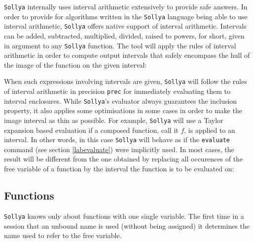 \documentclass[a4paper]{article}
\newcommand{\com}[1]{\texttt{#1}}
\newcommand{\sollya}{\texttt{Sollya}\xspace}
\begin{document}


\sollya internally uses interval arithmetic extensively to provide
safe answers. In order to provide for algorithms written in the
\sollya language being able to use interval arithmetic, \sollya offers
native support of interval arithmetic. Intervals can be added,
subtracted, multiplied, divided, raised to powers, for short, given in
argument to any \sollya function. The tool will apply the rules of
interval arithmetic in order to compute output intervals that safely
encompass the hull of the image of the function on the given interval:



When such expressions involving intervals are given, \sollya will
follow the rules of interval arithmetic in precision \com{prec} for
immediately evaluating them to interval enclosures. While \sollya's
evaluator always guarantees the inclusion property, it also applies
some optimisations in some cases in order to make the image interval
as thin as possible. For example, \sollya will use a Taylor expansion
based evaluation if a composed function, call it $f$, is applied to an
interval. In other words, in this case \sollya will behave as if the
\com{evaluate} command (see section \ref{labevaluate}) were implicitly
used. In most cases, the result will be different from the one obtained
by replacing all occurences of the free variable of a function by the 
interval the function is to be evaluated on:



\subsection{Functions}
\sollya knows only about functions with one single variable. The first time in a session that an unbound name is used (without being assigned) it determines the name used to refer to the free variable.
\end{document}
